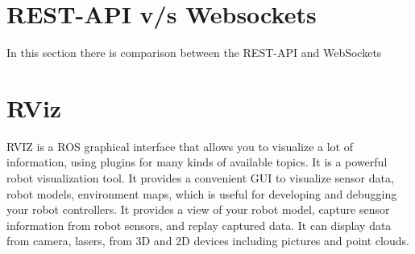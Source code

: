 \section{REST-API v/s Websockets}
In this section there is comparison between the REST-API and WebSockets
\begin{table}[!htbp]
\centering
{}
\caption{Comparison of WebSocket and REST-API}
\end{table}

\section{RViz}

RVIZ is a ROS graphical interface that allows you to visualize a lot of information, using plugins for
many kinds of available topics. It is a powerful robot visualization tool. It provides a convenient GUI to
visualize sensor data, robot models, environment maps, which is useful for developing and debugging
your robot controllers. It provides a view of your robot model, capture sensor information from robot
sensors, and replay captured data. It can display data from camera, lasers, from 3D and 2D devices
including pictures and point clouds.

